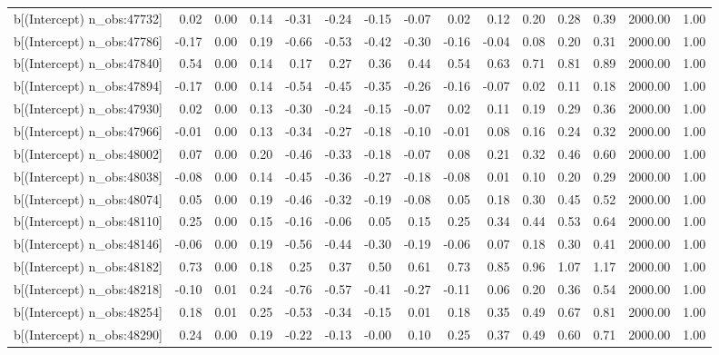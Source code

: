 \begin{table}[ht]
\begin{tabular}{rrrrrrrrrrrrrrr}
  b[(Intercept) n\_obs:47732] & 0.02 & 0.00 & 0.14 & -0.31 & -0.24 & -0.15 & -0.07 & 0.02 & 0.12 & 0.20 & 0.28 & 0.39 & 2000.00 & 1.00 \\ 
  b[(Intercept) n\_obs:47786] & -0.17 & 0.00 & 0.19 & -0.66 & -0.53 & -0.42 & -0.30 & -0.16 & -0.04 & 0.08 & 0.20 & 0.31 & 2000.00 & 1.00 \\ 
  b[(Intercept) n\_obs:47840] & 0.54 & 0.00 & 0.14 & 0.17 & 0.27 & 0.36 & 0.44 & 0.54 & 0.63 & 0.71 & 0.81 & 0.89 & 2000.00 & 1.00 \\ 
  b[(Intercept) n\_obs:47894] & -0.17 & 0.00 & 0.14 & -0.54 & -0.45 & -0.35 & -0.26 & -0.16 & -0.07 & 0.02 & 0.11 & 0.18 & 2000.00 & 1.00 \\ 
  b[(Intercept) n\_obs:47930] & 0.02 & 0.00 & 0.13 & -0.30 & -0.24 & -0.15 & -0.07 & 0.02 & 0.11 & 0.19 & 0.29 & 0.36 & 2000.00 & 1.00 \\ 
  b[(Intercept) n\_obs:47966] & -0.01 & 0.00 & 0.13 & -0.34 & -0.27 & -0.18 & -0.10 & -0.01 & 0.08 & 0.16 & 0.24 & 0.32 & 2000.00 & 1.00 \\ 
  b[(Intercept) n\_obs:48002] & 0.07 & 0.00 & 0.20 & -0.46 & -0.33 & -0.18 & -0.07 & 0.08 & 0.21 & 0.32 & 0.46 & 0.60 & 2000.00 & 1.00 \\ 
  b[(Intercept) n\_obs:48038] & -0.08 & 0.00 & 0.14 & -0.45 & -0.36 & -0.27 & -0.18 & -0.08 & 0.01 & 0.10 & 0.20 & 0.29 & 2000.00 & 1.00 \\ 
  b[(Intercept) n\_obs:48074] & 0.05 & 0.00 & 0.19 & -0.46 & -0.32 & -0.19 & -0.08 & 0.05 & 0.18 & 0.30 & 0.45 & 0.52 & 2000.00 & 1.00 \\ 
  b[(Intercept) n\_obs:48110] & 0.25 & 0.00 & 0.15 & -0.16 & -0.06 & 0.05 & 0.15 & 0.25 & 0.34 & 0.44 & 0.53 & 0.64 & 2000.00 & 1.00 \\ 
  b[(Intercept) n\_obs:48146] & -0.06 & 0.00 & 0.19 & -0.56 & -0.44 & -0.30 & -0.19 & -0.06 & 0.07 & 0.18 & 0.30 & 0.41 & 2000.00 & 1.00 \\ 
  b[(Intercept) n\_obs:48182] & 0.73 & 0.00 & 0.18 & 0.25 & 0.37 & 0.50 & 0.61 & 0.73 & 0.85 & 0.96 & 1.07 & 1.17 & 2000.00 & 1.00 \\ 
  b[(Intercept) n\_obs:48218] & -0.10 & 0.01 & 0.24 & -0.76 & -0.57 & -0.41 & -0.27 & -0.11 & 0.06 & 0.20 & 0.36 & 0.54 & 2000.00 & 1.00 \\ 
  b[(Intercept) n\_obs:48254] & 0.18 & 0.01 & 0.25 & -0.53 & -0.34 & -0.15 & 0.01 & 0.18 & 0.35 & 0.49 & 0.67 & 0.81 & 2000.00 & 1.00 \\ 
  b[(Intercept) n\_obs:48290] & 0.24 & 0.00 & 0.19 & -0.22 & -0.13 & -0.00 & 0.10 & 0.25 & 0.37 & 0.49 & 0.60 & 0.71 & 2000.00 & 1.00 \\ 

\end{tabular}
\end{table}
